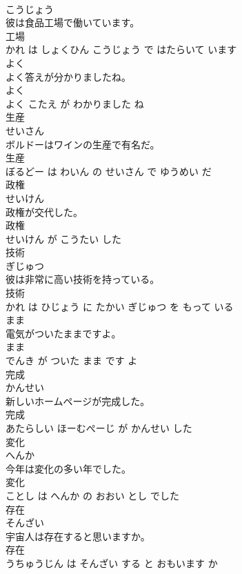 \documentclass[8pt]{extreport}
\begin{document}
\begin{CJK}{UTF8}{min}
\\	こうじょう			
\\	彼は食品工場で働いています。	
\\	工場 
\\	かれ は しょくひん こうじょう で はたらいて います			
\\	よく	
\\	よく答えが分かりましたね。	
\\	よく 
\\	よく こたえ が わかりました ね			
\\	生産	
\\	せいさん			
\\	ボルドーはワインの生産で有名だ。	
\\	生産 
\\	ぼるどー は わいん の せいさん で ゆうめい だ			
\\	政権	
\\	せいけん			
\\	政権が交代した。	
\\	政権 
\\	せいけん が こうたい した			
\\	技術	
\\	ぎじゅつ			
\\	彼は非常に高い技術を持っている。	
\\	技術 
\\	かれ は ひじょう に たかい ぎじゅつ を もって いる			
\\	まま	
\\	電気がついたままですよ。	
\\	まま 
\\	でんき が ついた まま です よ			
\\	完成	
\\	かんせい			
\\	新しいホームページが完成した。	
\\	完成 
\\	あたらしい ほーむぺーじ が かんせい した			
\\	変化	
\\	へんか			
\\	今年は変化の多い年でした。	
\\	変化 
\\	ことし は へんか の おおい とし でした			
\\	存在	
\\	そんざい			
\\	宇宙人は存在すると思いますか。	
\\	存在 
\\	うちゅうじん は そんざい する と おもいます か			

\end{CJK}
\end{document}

